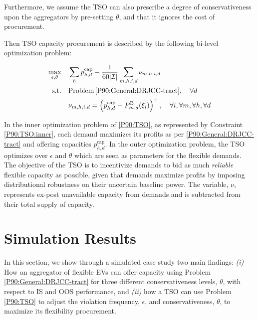 \documentclass[conference]{IEEEtran}
\begin{document}
Furthermore, we assume the \ac{TSO} can also prescribe a degree of conservativeness upon the aggregators by pre-setting $\theta$, and that it ignores the cost of procurement. 

Then \ac{TSO} capacity procurement is described by the following bi-level optimization problem:

\begin{subequations}\label{P90:TSO}
    \begin{align}
        \max_{\epsilon, \theta} \quad & \sum_h p_{h,d}^{\text{cap}} -  \frac{1}{60|\mathcal{I}|}\sum_{m,h,i,d} \nu_{m,h,i,d}                                                                                                                                                                                                      \\
        \text{s.t.} \quad               & \text{Problem} \thinspace \eqref{P90:General:DRJCC-tract}, \quad \forall{d} \label{P90:TSO:inner} \\
        & \nu_{m,h,i,d} = \left(p_{h,d}^{\text{cap}} - P_{m,d}^{\text{B}}(\xi_i) \right)^{+}, \quad \forall{i}, \forall{m}, \forall{h}, \forall{d}
    \end{align}
\end{subequations}

In the inner optimization problem of \eqref{P90:TSO}, as represented by Constraint \eqref{P90:TSO:inner}, each demand maximizes its profits as per \eqref{P90:General:DRJCC-tract} and offering capacities $p_{h,d}^{\text{cap}}$. In the outer optimization problem, the \ac{TSO} optimizes over $\epsilon$ and $\theta$ which are seen as parameters for the flexible demands. The objective of the \ac{TSO} is to incentivize demands to bid as much \textit{reliable} flexible capacity as possible, given that demands maximize profits by imposing distributional robustness on their uncertain baseline power. The variable, $\nu$, represents ex-post unavailable capacity from demands and is subtracted from their total supply of capacity.


\section{Simulation Results}

In this section, we show through a simulated case study two main findings: \textit{(i)} How an aggregator of flexible \acp{EV} can offer capacity using Problem \eqref{P90:General:DRJCC-tract} for three different conservativeness levels, $\theta$, with respect to \ac{IS} and \ac{OOS} performance, and \textit{(ii)} how a \ac{TSO} can use Problem \eqref{P90:TSO} to adjust the violation frequency, $\epsilon$, and conservativeness, $\theta$, to maximize its flexibility procurement.
\end{document}
